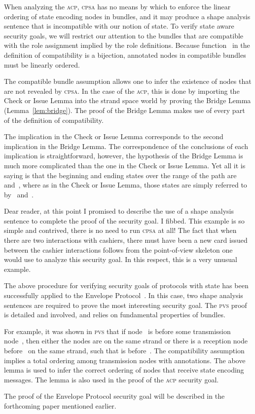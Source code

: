 \documentclass[titlepage,12pt]{article}
\newcommand{\cpsa}{\textsc{cpsa}}
\newcommand{\pvs}{\textsc{pvs}}
\newcommand{\acp}{\textsc{acp}}
\begin{document}
When analyzing the {\acp}, {\cpsa} has no means by which to enforce
the linear ordering of state encoding nodes in bundles, and it may
produce a shape analysis sentence that is incompatible with our notion
of state.  To verify state aware security goals, we will restrict our
attention to the bundles that are compatible with the role assignment
implied by the role definitions.  Because function~ in the
definition of compatibility is a bijection, annotated nodes in
compatible bundles must be linearly ordered.

The compatible bundle assumption allows one to infer the existence of
nodes that are not revealed by {\cpsa}.  In the case of the {\acp},
this is done by importing the Check or Issue Lemma into the strand space
world by proving the Bridge Lemma (Lemma~\ref{lem:bridge}).
The proof of the Bridge Lemma makes use of every part of the
definition of compatibility.

The implication in the Check or Issue Lemma corresponds to the second
implication in the Bridge Lemma.  The correspondence of the
conclusions of each implication is straightforward, however, the
hypothesis of the Bridge Lemma is much more complicated than the one
in the Check or Issue Lemma.  Yet all it is saying is that the
beginning and ending states over the range of the path are~
and~, where as in the Check or Issue Lemma, those states are
simply referred to by~ and~.

Dear reader, at this point I promised to describe the use of a shape
analysis sentence to complete the proof of the security goal.  I
fibbed.  This example is so simple and contrived, there is no need to
run {\cpsa} at all!  The fact that when there are two interactions
with cashiers, there must have been a new card issued between the
cashier interactions follows from the point-of-view skeleton one would
use to analyze this security goal.  In this respect, this is a very
unusual example.

The above procedure for verifying security goals of protocols with
state has been successfully applied to the Envelope
Protocol~\cite{ables2010escrowed}.  In this case, two shape analysis
sentences are required to prove the most interesting security goal.
The {\pvs} proof is detailed and involved, and relies on fundamental
properties of bundles.

For example, it was shown in {\pvs} that if node~ is before some
transmission node~, then either the nodes are on the same strand
or there is a reception node~ before~ on the same strand,
such that  is before~.  The compatibility assumption implies
a total ordering among transmission nodes with annotations.  The above
lemma is used to infer the correct ordering of nodes that receive
state encoding messages.  The lemma is also used in the proof of the
{\acp} security goal.

The proof of the Envelope Protocol security goal will be described in
the forthcoming paper mentioned earlier.

\printindex
\end{document}
